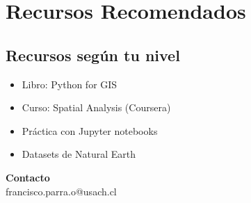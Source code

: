 \documentclass[11pt,a4paper]{article}
\begin{document}
\section*{ Recursos Recomendados}

\subsection*{Recursos según tu nivel}

\begin{itemize}[leftmargin=*]
    \item Libro: Python for GIS
    \item Curso: Spatial Analysis (Coursera)
    \item Práctica con Jupyter notebooks
    \item Datasets de Natural Earth
\end{itemize}


\vspace{0.5cm}

\begin{tcolorbox}[colback=gray!10,colframe=gray!50]
\centering
\textbf{Contacto}\\[0.2cm]
 francisco.parra.o@usach.cl
\end{tcolorbox}
\end{document}
